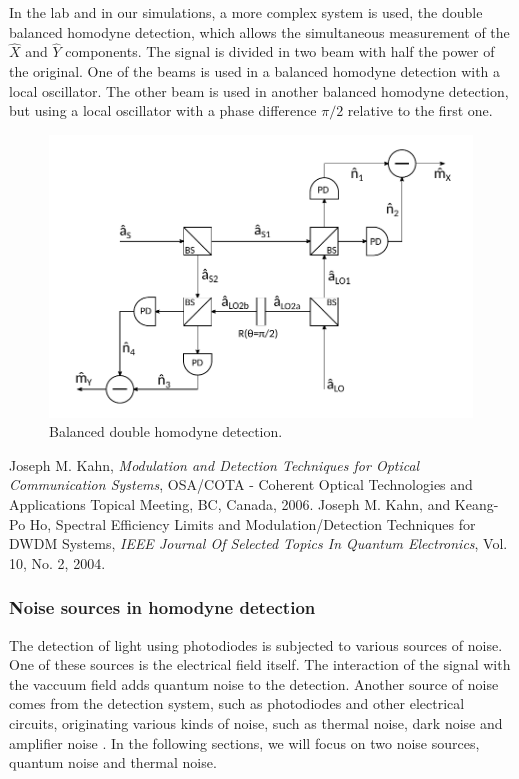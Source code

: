 %
In the lab and in our simulations, a more complex system is used, the double balanced homodyne detection, which allows the simultaneous measurement of the $\hat{X}$ and $\hat{Y}$ components. The signal is divided in two beam with half the power of the original. One of the beams is used in a balanced homodyne detection with a local oscillator. The other beam is used in another balanced homodyne detection, but using a local oscillator with a phase difference $\pi/2$ relative to the first one.
%
\begin{figure}[H]
	\label{fig:scheme_homodyne}
	\centering
	\includegraphics{./sdf/optical_detection/figures/scheme_double_homodyne.pdf}
	\caption{Balanced double homodyne detection.}
\end{figure}
%
%
%

\begin{thebibliography}{10}

  Joseph M. Kahn,
  \textit{Modulation and Detection Techniques for
Optical Communication Systems},
  OSA/COTA -  Coherent Optical Technologies and Applications Topical Meeting, BC, Canada,
  2006.
  Joseph M. Kahn, and Keang-Po Ho,
Spectral Efficiency Limits and Modulation/Detection
Techniques for DWDM Systems,
  \textit{IEEE Journal Of Selected Topics In Quantum Electronics}, Vol. 10, No. 2, 2004.

\end{thebibliography}

\subsubsection{Noise sources in homodyne detection}
The detection of light using photodiodes is subjected to various sources of noise. One of these sources is the electrical field itself. The interaction of the signal with the vaccuum field adds quantum noise to the detection.
Another source of noise comes from the detection system, such as photodiodes and other electrical circuits, originating various kinds of noise, such as thermal noise, dark noise and amplifier noise
\cite{hans2004}.
In the following sections, we will focus on two noise sources, quantum noise and thermal noise.
%
%
%
